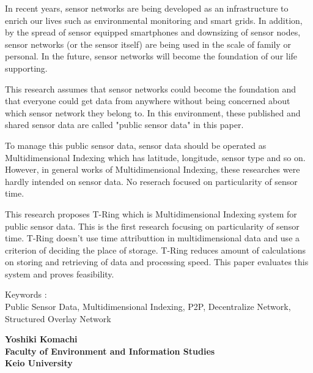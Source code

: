 \vspace{10mm}

In recent years, sensor networks are being developed as an infrastructure to enrich our lives such as environmental monitoring and smart grids. In addition, by the spread of sensor equipped smartphones and downsizing of sensor nodes, sensor networks (or the sensor itself) are being used in the scale of family or personal. In the future, sensor networks will become the foundation of our life supporting. 

This research assumes that sensor networks could become the foundation and that everyone could get data from anywhere without being concerned about which sensor network they belong to. In this environment, these published and shared sensor data are called "public sensor data" in this paper. 

To manage this public sensor data, sensor data should be operated as Multidimensional Indexing which has latitude, longitude, sensor type and so on. However, in general works of Multidimensional Indexing, these researches were hardly intended on sensor data. No reserach focused on particularity of sensor time.   


This research proposes T-Ring which is Multidimensional Indexing system for public sensor data. This is the first research focusing on particularity of sensor time. T-Ring doesn't use time attributtion in multidimensional data and  use a criterion of deciding the place of storage. T-Ring reduces amount of calculations on storing and retrieving of data and processing speed. This paper evaluates this system and proves feasibility.   

\vspace{10mm}
Keywords :\\
\hspace{3.5em}Public Sensor Data, Multidimensional Indexing, P2P, Decentralize Network, Structured Overlay Network
\begin{flushright}
\textbf{Yoshiki Komachi}\\
\vspace{5mm}
\textbf{Faculty of Environment and Information Studies}\\
\textbf{Keio University}
\end{flushright}
